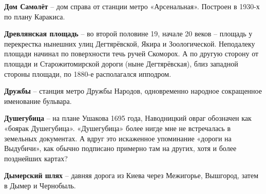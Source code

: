 \medskip

\textbf{Дом Самолёт} – дом справа от станции метро «Арсенальная». Построен в 1930-х по плану Каракиса.\\

\medskip

\textbf{Древлянская площадь} – во второй половине 19, начале 20 веков – площадь у перекрестка нынешних улиц Дегтярёвской, Якира и Зоологической. Неподалеку площади начинал по поверхности течь ручей Скоморох. А по другую сторону от площади и Старожитомирской дороги (ныне Дегтярёвская), близ западной стороны площади, по 1880-е располагался ипподром.\\

\medskip

\textbf{Дружбы} – станция метро Дружбы Народов, одновременно народное сокращенное именование бульвара.\\

\medskip

\textbf{Душегубица} – на плане Ушакова 1695 года, Наводницкий овраг обозначен как «боярак Душегубица». «Душегубица» более нигде мне не встречалась в земельных документах. А вдруг это искаженное упоминание «дороги на Выдубичи», как обычно подписано примерно там на других, хотя и более позднейших картах?\\

\medskip

\textbf{Дымерский шлях} – давняя дорога из Киева через Межигорье, Вышгород, затем в Дымер и Чернобыль.

